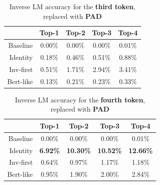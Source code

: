 \documentclass[../thesis.tex]{subfiles}
\begin{document}
\begin{table}[bthp]
\centering
\begin{tabular}{rcccc}
\toprule
           & \textbf{Top-1} & \textbf{Top-2} & \textbf{Top-3} & \textbf{Top-4} \\
\midrule
Baseline   & 0.00\%         & 0.00\%         & 0.00\%         & 0.01\%         \\
Identity   & 0.18\%         & 0.46\%         & 0.51\%         & 0.88\%         \\
Inv-first  & 0.51\%         & 1.71\%         & 2.94\%         & 3.41\%         \\
Bert-like  & 0.13\%         & 0.21\%         & 0.23\%         & 0.33\%         \\
\bottomrule
\end{tabular}
\vspace{0.25cm}
\caption{Inverse LM accuracy for the \textbf{third token}, replaced with \textbf{PAD}}
\label{table:tinystories__inversion_third_token_pad}
\end{table}


\begin{table}[bthp]
\centering
\begin{tabular}{rcccc}
\toprule
          & \textbf{Top-1}  & \textbf{Top-2}   & \textbf{Top-3}   & \textbf{Top-4}   \\
\midrule
Baseline  & 0.00\%          & 0.00\%           & 0.00\%           & 0.01\%           \\
Identity  & \textbf{6.92\%} & \textbf{10.30\%} & \textbf{10.52\%} & \textbf{12.66\%} \\
Inv-first & 0.64\%          & 0.97\%           & 1.17\%           & 1.18\%           \\
Bert-like & 0.95\%          & 1.90\%           & 2.00\%           & 2.84\%           \\
\bottomrule
\end{tabular}
\vspace{0.25cm}
\caption{Inverse LM accuracy for the \textbf{fourth token}, replaced with \textbf{PAD}}
\label{table:tinystories__inversion_fourth_token_pad}
\end{table}
\end{document}

